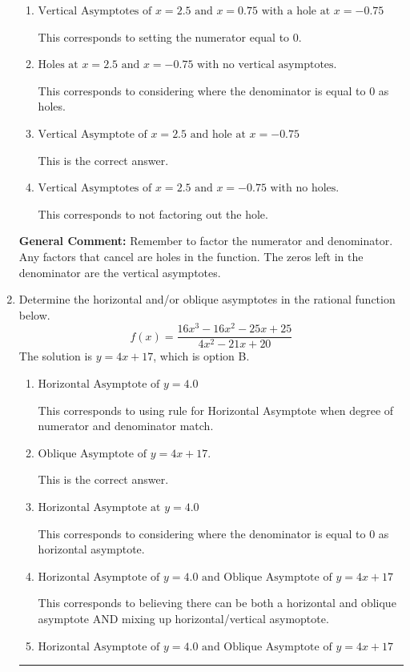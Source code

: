 \documentclass{extbook}[14pt]
\newcommand{\litem}[1]{\item #1

\rule{\textwidth}{0.4pt}}
\begin{document}
\begin{enumerate}
{\begin{enumerate}[label=\Alph*.]
This corresponds to mixing vertical and horizontal asymptotes.
\item \( \text{Vertical Asymptotes of } x = 2.5 \text{ and } x = 0.75 \text{ with a hole at } x = -0.75 \)

This corresponds to setting the numerator equal to 0.
\item \( \text{Holes at } x = 2.5 \text{ and } x = -0.75 \text{ with no vertical asymptotes.} \)

This corresponds to considering where the denominator is equal to 0 as holes.
\item \( \text{Vertical Asymptote of } x = 2.5 \text{ and hole at } x = -0.75 \)

This is the correct answer.
\item \( \text{Vertical Asymptotes of } x = 2.5 \text{ and } x = -0.75 \text{ with no holes.} \)

This corresponds to not factoring out the hole.
\end{enumerate}

\textbf{General Comment:} Remember to factor the numerator and denominator. Any factors that cancel are holes in the function. The zeros left in the denominator are the vertical asymptotes.
}
\litem{
Determine the horizontal and/or oblique asymptotes in the rational function below.
\[ f(x) = \frac{16x^{3} -16 x^{2} -25 x + 25}{4x^{2} -21 x + 20} \]The solution is \( y = 4x + 17 \), which is option B.\begin{enumerate}[label=\Alph*.]
\item \( \text{Horizontal Asymptote of } y = 4.0  \)

This corresponds to using rule for Horizontal Asymptote when degree of numerator and denominator match.
\item \( \text{Oblique Asymptote of } y = 4x + 17. \)

This is the correct answer.
\item \( \text{Horizontal Asymptote at } y = 4.0 \)

This corresponds to considering where the denominator is equal to 0 as horizontal asymptote.
\item \( \text{Horizontal Asymptote of } y = 4.0 \text{ and Oblique Asymptote of } y = 4x + 17 \)

This corresponds to believing there can be both a horizontal and oblique asymptote AND mixing up horizontal/vertical asymoptote.
\item \( \text{Horizontal Asymptote of } y = 4.0 \text{ and Oblique Asymptote of } y = 4x + 17 \)


\end{enumerate}}
\end{enumerate}
\end{document}
